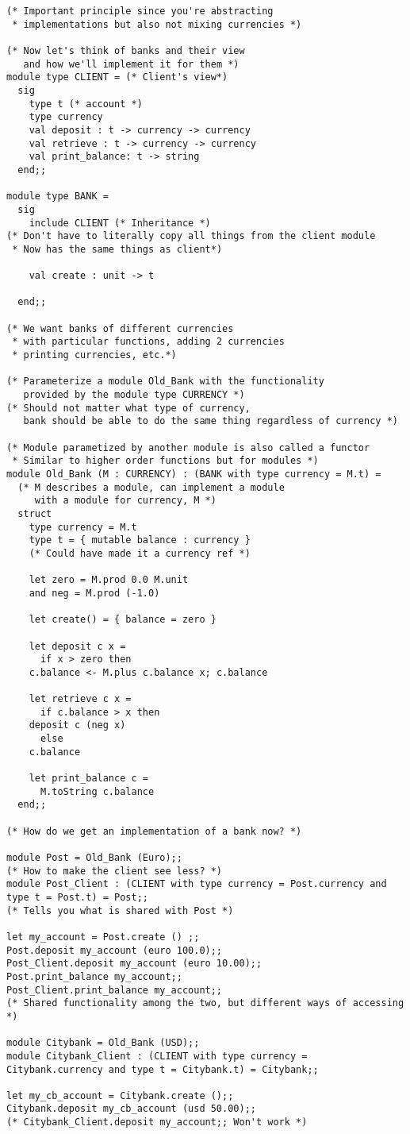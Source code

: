 \documentclass[11pt]{article}
\begin{document}
\begin{verbatim}
(* Important principle since you're abstracting 
 * implementations but also not mixing currencies *)

(* Now let's think of banks and their view 
   and how we'll implement it for them *)
module type CLIENT = (* Client's view*)
  sig
    type t (* account *)
    type currency
    val deposit : t -> currency -> currency
    val retrieve : t -> currency -> currency
    val print_balance: t -> string
  end;;

module type BANK =
  sig
    include CLIENT (* Inheritance *)
(* Don't have to literally copy all things from the client module 
 * Now has the same things as client*)

    val create : unit -> t

  end;;

(* We want banks of different currencies 
 * with particular functions, adding 2 currencies
 * printing currencies, etc.*)

(* Parameterize a module Old_Bank with the functionality 
   provided by the module type CURRENCY *)
(* Should not matter what type of currency, 
   bank should be able to do the same thing regardless of currency *)

(* Module parametized by another module is also called a functor 
 * Similar to higher order functions but for modules *)
module Old_Bank (M : CURRENCY) : (BANK with type currency = M.t) =
  (* M describes a module, can implement a module 
     with a module for currency, M *)
  struct
    type currency = M.t
    type t = { mutable balance : currency }
    (* Could have made it a currency ref *)

    let zero = M.prod 0.0 M.unit
    and neg = M.prod (-1.0)

    let create() = { balance = zero }

    let deposit c x =
      if x > zero then
	c.balance <- M.plus c.balance x; c.balance

    let retrieve c x =
      if c.balance > x then
	deposit c (neg x)
      else
	c.balance

    let print_balance c =
      M.toString c.balance
  end;;

(* How do we get an implementation of a bank now? *)

module Post = Old_Bank (Euro);;
(* How to make the client see less? *)
module Post_Client : (CLIENT with type currency = Post.currency and type t = Post.t) = Post;;
(* Tells you what is shared with Post *)

let my_account = Post.create () ;;
Post.deposit my_account (euro 100.0);;
Post_Client.deposit my_account (euro 10.00);;
Post.print_balance my_account;;
Post_Client.print_balance my_account;;
(* Shared functionality among the two, but different ways of accessing *)

module Citybank = Old_Bank (USD);;
module Citybank_Client : (CLIENT with type currency = Citybank.currency and type t = Citybank.t) = Citybank;;

let my_cb_account = Citybank.create ();;
Citybank.deposit my_cb_account (usd 50.00);;
(* Citybank_Client.deposit my_account;; Won't work *)
\end{verbatim}
\end{document}
